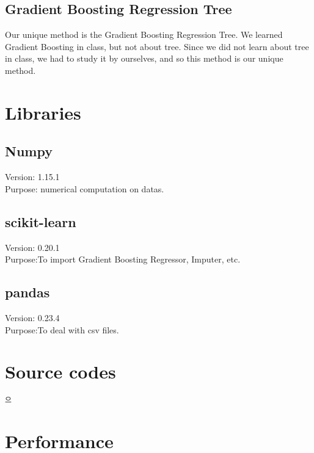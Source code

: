 \documentclass{article}
\begin{document}
\subsection{Gradient Boosting Regression Tree}
Our unique method is the Gradient Boosting Regression Tree. We learned Gradient Boosting in class, but not about tree. Since we did not learn about tree in class, we had to study it by ourselves, and so this method is our unique method.
\section{Libraries}
\subsection{Numpy}
\noindent
Version: 1.15.1 \\
Purpose: numerical computation on datas.

\subsection{scikit-learn}
\noindent
Version: 0.20.1\\
Purpose:To import Gradient Boosting Regressor, Imputer, etc.

\subsection{pandas}
\noindent
Version: 0.23.4\\
Purpose:To deal with csv files.

\section{Source codes}
\begin{lstlisting}
으
\end{lstlisting}


\section{Performance}
\end{document}
